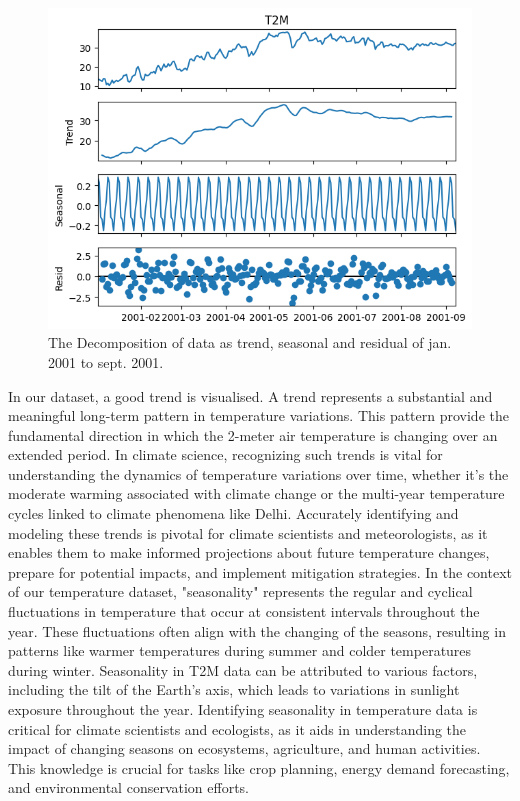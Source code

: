 \documentclass[sn-mathphys,Numbered]{sn-jnl}
\theoremstyle{thmstyleone}
\theoremstyle{thmstyletwo}
\theoremstyle{thmstylethree}
\begin{document}
  \begin{figure}[ht!]
    \centering
    \includegraphics[width=1\textwidth, height=0.75\linewidth]{Graphycal_EDA.png}
    \caption{The Decomposition of data as trend, seasonal and residual of  jan. 2001 to sept. 2001.  }
    \label{fig:graphycalEDA}
\end{figure}
In our dataset, a good trend is visualised. A trend represents a substantial and meaningful long-term pattern in temperature variations. This pattern provide the fundamental direction in which the 2-meter air temperature is changing over an extended period. In climate science, recognizing such trends is vital for understanding the dynamics of temperature variations over time, whether it's the moderate warming associated with climate change or the multi-year temperature cycles linked to climate phenomena like Delhi. Accurately identifying and modeling these trends is pivotal for climate scientists and meteorologists, as it enables them to make informed projections about future temperature changes, prepare for potential impacts, and implement mitigation strategies.
In the context of our temperature dataset, "seasonality" represents the regular and cyclical fluctuations in temperature that occur at consistent intervals throughout the year. These fluctuations often align with the changing of the seasons, resulting in patterns like warmer temperatures during summer and colder temperatures during winter. Seasonality in T2M data can be attributed to various factors, including the tilt of the Earth's axis, which leads to variations in sunlight exposure throughout the year. Identifying seasonality in temperature data is critical for climate scientists and ecologists, as it aids in understanding the impact of changing seasons on ecosystems, agriculture, and human activities. This knowledge is crucial for tasks like crop planning, energy demand forecasting, and environmental conservation efforts.
\end{document}
